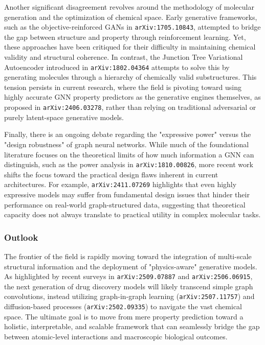 \documentclass[11pt]{article}
\begin{document}
Another significant disagreement revolves around the methodology of molecular generation and the optimization of chemical space. Early generative frameworks, such as the objective-reinforced GANs in \texttt{arXiv:1705.10843}, attempted to bridge the gap between structure and property through reinforcement learning. Yet, these approaches have been critiqued for their difficulty in maintaining chemical validity and structural coherence. In contrast, the Junction Tree Variational Autoencoder introduced in \texttt{arXiv:1802.04364} attempts to solve this by generating molecules through a hierarchy of chemically valid substructures. This tension persists in current research, where the field is pivoting toward using highly accurate GNN property predictors as the generative engines themselves, as proposed in \texttt{arXiv:2406.03278}, rather than relying on traditional adversarial or purely latent-space generative models.

Finally, there is an ongoing debate regarding the "expressive power" versus the "design robustness" of graph neural networks. While much of the foundational literature focuses on the theoretical limits of how much information a GNN can distinguish, such as the power analysis in \texttt{arXiv:1810.00826}, more recent work shifts the focus toward the practical design flaws inherent in current architectures. For example, \texttt{arXiv:2411.07269} highlights that even highly expressive models may suffer from fundamental design issues that hinder their performance on real-world graph-structured data, suggesting that theoretical capacity does not always translate to practical utility in complex molecular tasks.

\subsubsection{Outlook}

The frontier of the field is rapidly moving toward the integration of multi-scale structural information and the deployment of "physics-aware" generative models. As highlighted by recent surveys in \texttt{arXiv:2509.07887} and \texttt{arXiv:2506.06915}, the next generation of drug discovery models will likely transcend simple graph convolutions, instead utilizing graph-in-graph learning (\texttt{arXiv:2507.11757}) and diffusion-based processes (\texttt{arXiv:2502.09335}) to navigate the vast chemical space. The ultimate goal is to move from mere property prediction toward a holistic, interpretable, and scalable framework that can seamlessly bridge the gap between atomic-level interactions and macroscopic biological outcomes.
\end{document}
